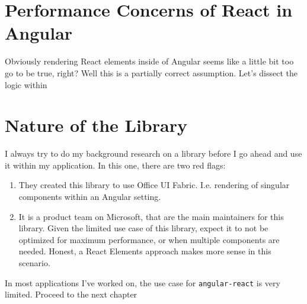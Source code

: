 \section{Performance Concerns of React in Angular}
Obviously rendering React elements inside of Angular seems like a little bit too go to be true, right? Well this is a partially correct assumption. Let's dissect the logic within 

\section{Nature of the Library}
I always try to do my background research on a library before I go ahead and use it within my application. In this one, there are two red flags: 
\begin{enumerate}
  \item They created this library to use Office UI Fabric. I.e. rendering of singular components within an Angular setting. 
  \item It is a product team on Microsoft, that are the main maintainers for this library. Given the limited use case of this library, expect it to not be optimized for maximum performance, or when multiple components are needed. Honest, a React Elements approach makes more sense in this scenario. 
\end{enumerate}

In most applications I've worked on, the use case for \lstinline{angular-react} is very limited. Proceed to the next chapter 